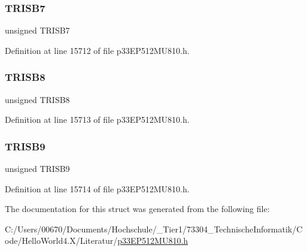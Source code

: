 \subsubsection{\texorpdfstring{T\+R\+I\+S\+B7}{TRISB7}}
{\footnotesize\ttfamily unsigned T\+R\+I\+S\+B7}



Definition at line 15712 of file p33\+E\+P512\+M\+U810.\+h.

\mbox{\label{structtag_t_r_i_s_b_b_i_t_s_a5f2fd75ee958ad7ba6d23b534b702412}} 
\subsubsection{\texorpdfstring{T\+R\+I\+S\+B8}{TRISB8}}
{\footnotesize\ttfamily unsigned T\+R\+I\+S\+B8}



Definition at line 15713 of file p33\+E\+P512\+M\+U810.\+h.

\mbox{\label{structtag_t_r_i_s_b_b_i_t_s_aefa44ddbe56cf2aeba4e213ce02da413}} 
\subsubsection{\texorpdfstring{T\+R\+I\+S\+B9}{TRISB9}}
{\footnotesize\ttfamily unsigned T\+R\+I\+S\+B9}



Definition at line 15714 of file p33\+E\+P512\+M\+U810.\+h.



The documentation for this struct was generated from the following file\+:\begin{DoxyCompactItemize}
\item 
C\+:/\+Users/00670/\+Documents/\+Hochschule/\+\_\+\+Tier1/73304\+\_\+\+Technische\+Informatik/\+Code/\+Hello\+World4.\+X/\+Literatur/\hyperlink{p33_e_p512_m_u810_8h}{p33\+E\+P512\+M\+U810.\+h}\end{DoxyCompactItemize}
